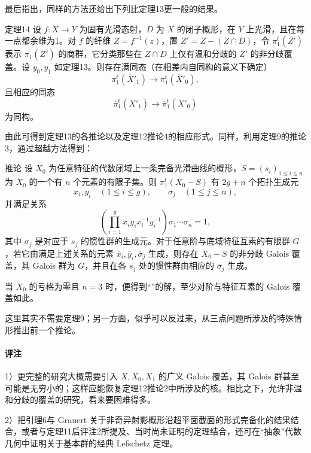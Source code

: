最后指出，同样的方法还给出下列比定理13更一般的结果。
\begin{statement}{定理14}
设 $f:X\to Y$ 为固有光滑态射，$D$ 为 $X$ 的闭子概形，在 $Y$ 上光滑，且在每一点都余维为1。对 $f$ 的纤维 $Z=f^{-1}(z)$，置 $Z'=Z-(Z\cap D)$，令 $\pi_1^t(\overline Z')$ 表示 $\pi_1(\overline Z')$ 的商群，它分类那些在 $\overline Z\cap D$ 上仅有温和分歧的 $\overline Z'$ 的非分歧覆盖。设 $y_0,y_1$ 如定理13。则存在满同态（在相差内自同构的意义下确定）
\[
\pi_1^t(\overline X'_1)\longrightarrow\pi_1^t(\overline X'_0),
\]
且相应的同态
\[
\overline\pi_1^t(\overline X'_1)\longrightarrow\overline\pi_1^t(\overline X'_0)
\]
为同构。
\end{statement}
由此可得到定理13的各推论以及定理12推论4的相应形式。同样，利用定理9的推论3，通过超越方法得到：
\begin{statement}{推论}
设 $X_0$ 为任意特征的代数闭域上一条完备光滑曲线的概形，$S=(s_i)_{1\le i\le n}$ 为 $X_0$ 的一个有 $n$ 个元素的有限子集。则 $\pi_1^t(X_0-S)$ 有 $2g+n$ 个拓扑生成元
\[
x_i,y_i\quad(1\le i\le g),\qquad \sigma_j\quad(1\le j\le n),
\]
并满足关系
\[
\left(\prod_{i=1}^g x_iy_ix_i^{-1}y_i^{-1}\right)\sigma_1\cdots\sigma_n=1,
\]
其中 $\sigma_j$ 是对应于 $s_j$ 的惯性群的生成元。对于任意阶与底域特征互素的有限群 $G$，若它由满足上述关系的元素 $\overline x_i,\overline y_i,\overline\sigma_j$ 生成，则存在 $X_0-S$ 的非分歧 Galois 覆盖，其 Galois 群为 $G$，并且在各 $s_j$ 处的惯性群由相应的 $\overline\sigma_j$ 生成。
\end{statement}
当 $X_0$ 的亏格为零且 $n=3$ 时，便得到“”的解，至少对阶与特征互素的 Galois 覆盖如此。

这里其实不需要定理9；另一方面，似乎可以反过来，从三点问题所涉及的特殊情形推出前一个推论。

\paragraph{评注}
1）更完整的研究大概需要引入 $X,X_0,X_1$ 的广义 Galois 覆盖，其 Galois 群甚至可能是无穷小的；这样应能恢复定理12推论2中所涉及的核。相比之下，允许非温和分歧的覆盖的研究，看来要困难得多。

2）把引理6与 Grauert 关于非奇异射影概形沿超平面截面的形式完备化的结果结合，或者与定理11后评注2所提及、当时尚未证明的定理结合，还可在“抽象”代数几何中证明关于基本群的经典 Lefschetz 定理。

